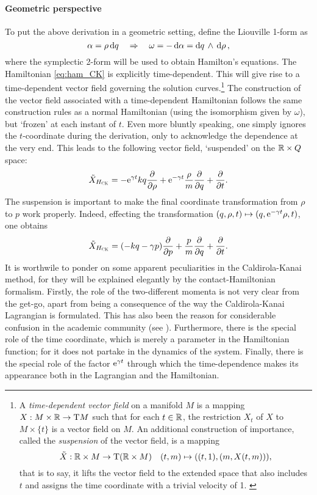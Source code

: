 \paragraph{Geometric perspective}
To put the above derivation in a geometric setting, define the Liouville 1-form as
$$ \alpha = \rho\dd{q} \quad \Rightarrow \quad \omega = -\dd{\alpha} =  \dd{q}\,\wedge\,\dd{\ensuremath{\rho}} ,$$
where the symplectic 2-form will be used to obtain Hamilton's equations. The Hamiltonian \cref{eq:ham_CK} is explicitly time-dependent. This will give rise to a time-dependent vector field governing the solution curves.\footnote
{A \emph{time-dependent vector field} on a manifold $M$ is a mapping $X: M\times\mathbb{R} \to \mathrm{T}M$ such that for each $t \in \mathbb{R}$, the restriction $X_t$ of $X$ to $M \times \{t\}$ is a vector field on $M$. \cite{Libermann1987} An additional construction of importance, called the \emph{suspension} of the vector field, is a mapping $$ \tilde{X}: \mathbb{R} \times M \to \mathrm{T}(\mathbb{R} \times M) \quad (t, m) \mapsto ((t, 1), (m, X(t, m))),$$ that is to say, it lifts the vector field to the extended space that also includes $t$ and assigns the time coordinate with a trivial velocity of 1. \cite{Abraham1978}}
The construction of the vector field associated with a time-dependent Hamiltonian follows the same construction rules as a normal Hamiltonian (using the isomorphism given by $\omega$), but `frozen' at each instant of $t$. Even more bluntly speaking, one simply ignores the $t$-coordinate during the derivation, only to acknowledge the dependence at the very end. This leads to the following vector field, `suspended' on the $\mathbb{R}\times Q$ space:
$$ \tilde{X}_{H_\text{\tiny{\textsc{CK}}}} = -\mathrm{e}^{\gamma t}kq\pdv{}{\ensuremath{\rho}} + \mathrm{e}^{-\gamma t}\frac{\rho}{m}\pdv{}{q} + \pdv{}{t}.$$
The suspension is important to make the final coordinate transformation from $\rho$ to $p$ work properly. Indeed, effecting the transformation $(q, \rho, t) \mapsto (q, \mathrm{e}^{-\gamma t}\rho, t)$, one obtains
$$ \tilde{X}_{H_\text{\tiny{\textsc{CK}}}} = \qty(-kq - \gamma p)\pdv{}{p} + \frac{p}{m}\pdv{}{q} + \pdv{}{t}.$$
It is worthwile to ponder on some apparent peculiarities in the Caldirola-Kanai method, for they will be explained elegantly by the contact-Hamiltonian formalism. Firstly, the role of the two-different momenta is not very clear from the get-go, apart from being a consequence of the way the Caldirola-Kanai Lagrangian is formulated. This has also been the reason for considerable confusion in the academic community (see \citet{Schuch1997}). Furthermore, there is the special role of the time coordinate, which is merely a parameter in the Hamiltonian function; for it does not partake in the dynamics of the system. Finally, there is the special role of the factor $\mathrm{e}^{\gamma t}$ through which the time-dependence makes its appearance both in the Lagrangian and the Hamiltonian.

